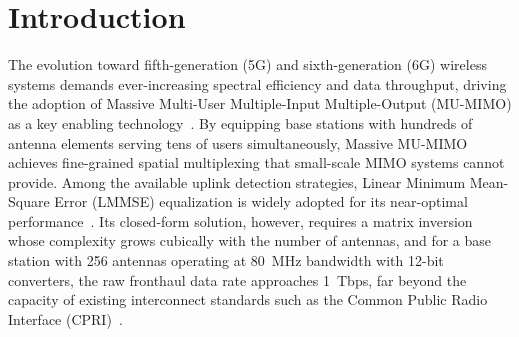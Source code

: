 \documentclass[12pt]{article}
\begin{document}
\section{Introduction}
\label{sec:introduction}
%
%
%

The evolution toward fifth-generation (5G) and sixth-generation (6G) wireless
systems demands ever-increasing spectral efficiency and data throughput, driving
the adoption of Massive Multi-User Multiple-Input Multiple-Output (MU-MIMO) as
a key enabling technology~\cite{decentralized2017}. By equipping base stations
with hundreds of antenna elements serving tens of users simultaneously, Massive
MU-MIMO achieves fine-grained spatial multiplexing that small-scale MIMO systems
cannot provide. Among the available uplink detection strategies, Linear Minimum
Mean-Square Error (LMMSE) equalization is widely adopted for its near-optimal
performance~\cite{zhao2025jsac}. Its closed-form solution, however, requires a
matrix inversion whose complexity grows cubically with the number of antennas,
and for a base station with 256 antennas operating at 80~MHz bandwidth with
12-bit converters, the raw fronthaul data rate approaches 1~Tbps, far beyond
the capacity of existing interconnect standards such as the Common Public Radio
Interface (CPRI)~\cite{li2019cd}.
\end{document}
